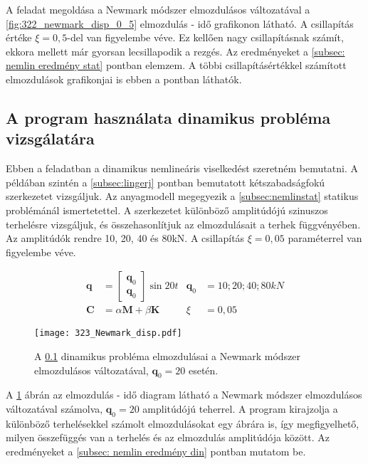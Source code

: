 A feladat megoldása a Newmark módszer elmozdulásos változatával a \ref{fig:322_newmark_disp_0_5} elmozdulás - idő grafikonon látható. A csillapítás értéke $\xi = 0,5$-del van figyelembe véve. Ez kellően nagy csillapításnak számít, ekkora  mellett már gyorsan lecsillapodik a rezgés. Az eredményeket a \ref{subsec: nemlin eredmény stat} pontban elemzem. A többi csillapításértékkel számított elmozdulások grafikonjai is ebben a  pontban láthatók. 


\subsection{A program használata dinamikus probléma vizsgálatára} \label{subsec:nemlindin}

Ebben a feladatban a dinamikus nemlineáris viselkedést szeretném bemutatni. A  példában szintén a \ref{subsec:lingerj} pontban bemutatott kétszabadságfokú szerkezetet vizsgáljuk. Az anyagmodell megegyezik a \ref{subsec:nemlinstat} statikus problémánál ismertetettel. A szerkezetet különböző amplitúdójú szinuszos terhelésre vizsgáljuk, és összehasonlítjuk az elmozdulásait a terhek függvényében. Az amplitúdók rendre 10, 20, 40 és 80kN. A csillapítás $\xi = 0,05$ paraméterrel van figyelembe véve. 
 
\begin{align*}
\mathbf{q} & = \left[\begin{array}{cc}\mathbf{q}_0\\ \mathbf{q}_0 \end{array}\right] \sin{20t} & \mathbf{q}_0 & = 10; 20; 40; 80 kN\\
\mathbf{C} & = \alpha\mathbf{M}+\beta\mathbf{K}  &   \xi & = 0,05 
\end{align*}

% 
% 
% 

\begin{figure}[h!]
\centering
\texttt{[image: 323\_Newmark\_disp.pdf]}
\caption{A \ref{subsec:nemlindin} dinamikus probléma elmozdulásai a Newmark módszer elmozdulásos változatával, $\mathbf{q}_0 = 20$ esetén.}
\label{fig:323_newmark_disp}
\end{figure}

A \ref{fig:323_newmark_disp} ábrán az elmozdulás - idő diagram látható a Newmark módszer elmozdulásos változatával számolva, $\mathbf{q}_0 = 20$ amplitúdójú teherrel. A program kirajzolja a különböző terhelésekkel számolt elmozdulásokat egy ábrára is, így megfigyelhető, milyen összefüggés van a terhelés és az elmozdulás amplitúdója között. Az eredményeket a \ref{subsec: nemlin eredmény din} pontban mutatom be. 


